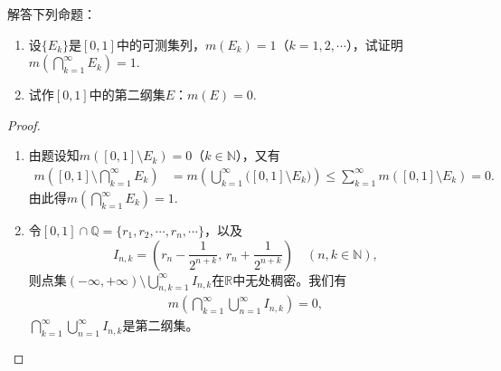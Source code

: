 \documentclass[../../main.tex]{subfiles}%
\begin{document}
\begin{example}
解答下列命题：
\begin{enumerate}[(1)]
\item 设$\{E_k\}$是$[0,1]$中的可测集列，$m(E_k)=1$（$k=1,2,\cdots$），试证明$m\left(\bigcap\limits_{k=1}^{\infty}E_k\right)=1$.

\item 试作$[0,1]$中的第二纲集$E$：$m(E)=0$.
\end{enumerate}
\end{example}
\begin{proof}
\begin{enumerate}[(1)]
\item 由题设知$m([0,1]\setminus E_k)=0$（$k\in\mathbb{N}$），又有
\begin{align*}
m\left([0,1]\setminus\bigcap\limits_{k=1}^{\infty}E_k\right) &= m\left(\bigcup\limits_{k=1}^{\infty}\bigl([0,1]\setminus E_k\bigr)\right) \leqslant \sum\limits_{k=1}^{\infty}m([0,1]\setminus E_k) = 0.
\end{align*}
由此得$m\left(\bigcap\limits_{k=1}^{\infty}E_k\right)=1$.

\item 令$[0,1]\cap\mathbb{Q}=\{r_1,r_2,\cdots,r_n,\cdots\}$，以及
\[
I_{n,k} = \left(r_n - \frac{1}{2^{n+k}},\, r_n + \frac{1}{2^{n+k}}\right) \quad (n,k\in\mathbb{N}),
\]
则点集$(-\infty,+\infty)\setminus\bigcup\limits_{n,k=1}^{\infty}I_{n,k}$在$\mathbb{R}$中无处稠密。我们有
\begin{align*}
m\left(\bigcap\limits_{k=1}^{\infty}\bigcup\limits_{n=1}^{\infty}I_{n,k}\right) = 0,
\end{align*}
$\bigcap\limits_{k=1}^{\infty}\bigcup\limits_{n=1}^{\infty}I_{n,k}$是第二纲集。
\end{enumerate}

\end{proof}
\end{document}
